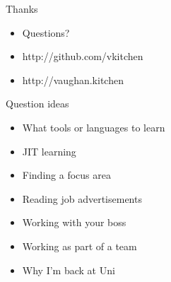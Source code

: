 \documentclass{beamer}
\begin{document}
\begin{frame}{Thanks}
\begin{itemize}
\item Questions?
\item http://github.com/vkitchen
\item http://vaughan.kitchen
\end{itemize}
\end{frame}

\begin{frame}{Question ideas}
\begin{itemize}
\item What tools or languages to learn
\item JIT learning
\item Finding a focus area
\item Reading job advertisements
\item Working with your boss
\item Working as part of a team
\item Why I'm back at Uni
\end{itemize}
\end{frame}
\end{document}
